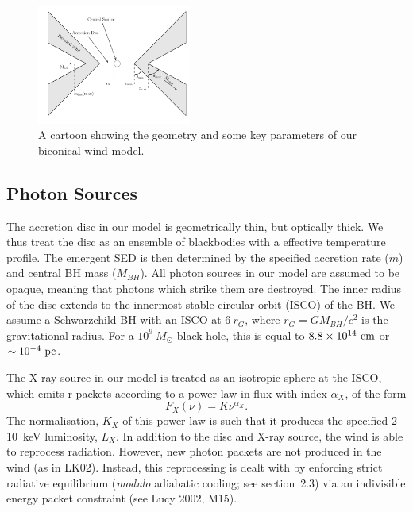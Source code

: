 \documentclass[useAMS,usenatbib]{mn2e_x}
\begin{document}
\begin{figure} 
\centering
\includegraphics[width=0.45\textwidth]{figures/fig2_cartoon.png}
\caption
{
A cartoon showing the geometry and some key parameters of
our biconical wind model.
}
\label{fig:cartoon}
\end{figure} 

\subsection{Photon Sources}

The accretion disc in our model is geometrically thin, but optically thick.
We thus treat the disc as an ensemble of blackbodies with a 
\cite{shakurasunyaev1973} effective temperature profile. 
The emergent SED is then determined by the specified accretion rate ($\dot{m}$)
and central BH mass ($M_{BH}$).
All photon sources in our model are assumed to be opaque, meaning
that photons which strike them are destroyed.
The inner radius of the disc extends to the innermost 
stable circular orbit (ISCO) of the BH. 
We assume a Schwarzchild BH with an ISCO at $6~r_G$, where 
$r_G = GM_{BH}/c^2$ is the gravitational radius.
For a $10^9~M_\odot$ black hole, this is equal to $8.8\times10^{14}~{\rm cm}$ 
or $\sim10^{-4}~{\rm pc}$.  


The X-ray source in our model is treated as an isotropic sphere at the ISCO,
which emits r-packets according to a power law in flux with index $\alpha_X$, of the form
\begin{equation}
F_X (\nu) = K \nu^{\alpha_X}.
\end{equation}
The normalisation, $K_X$ of this power law is such that it 
produces the specified 2-10~keV luminosity, $L_X$.
In addition to the disc and X-ray source, 
the wind is able to reprocess radiation. However, new 
photon packets are not produced in the wind (as in LK02). 
Instead, this reprocessing is dealt with by enforcing strict
radiative equilibrium ({\em modulo} adiabatic cooling; see section~2.3)
via an indivisible energy packet
constraint (see Lucy 2002, M15).
\end{document}
